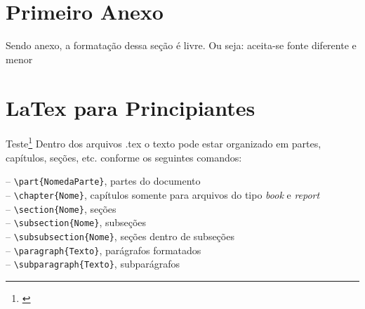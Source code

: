\begin{anexosenv}

\partanexos



\chapter{Primeiro Anexo}

Sendo anexo, a formatação dessa seção é livre. Ou seja: aceita-se fonte diferente e menor


\chapter{LaTex para Principiantes}\label{anexo:latex}
Teste\footnote{\cite{Moro2012}}
Dentro dos arquivos .tex o texto pode estar organizado em partes, capítulos, seções, etc. conforme os seguintes comandos:

-- \verb|\part{NomedaParte}|, partes do documento \\
-- \verb|\chapter{Nome}|, capítulos somente para arquivos do tipo \textit{book} e \textit{report}\\
-- \verb|\section{Nome}|, seções\\
-- \verb|\subsection{Nome}|, subseções	\\
-- \verb|\subsubsection{Nome}|, seções dentro de subseções\\
-- \verb|\paragraph{Texto}|, parágrafos formatados	\\
-- \verb|\subparagraph{Texto}|, subparágrafos


\end{anexosenv}
